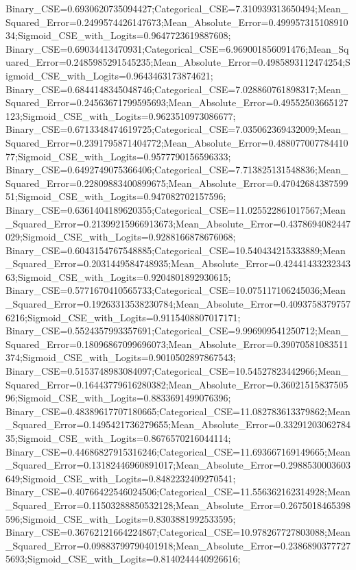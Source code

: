 Binary_CSE=0.6930620735094427;Categorical_CSE=7.310939313650494;Mean_Squared_Error=0.2499574426147673;Mean_Absolute_Error=0.49995731510891034;Sigmoid_CSE_with_Logits=0.9647723619887608;
Binary_CSE=0.69034413470931;Categorical_CSE=6.969001856091476;Mean_Squared_Error=0.2485985291545235;Mean_Absolute_Error=0.4985893112474254;Sigmoid_CSE_with_Logits=0.9643463173874621;
Binary_CSE=0.6844148345048746;Categorical_CSE=7.028860761898317;Mean_Squared_Error=0.24563671799595693;Mean_Absolute_Error=0.49552503665127123;Sigmoid_CSE_with_Logits=0.9623510973086677;
Binary_CSE=0.6713348474619725;Categorical_CSE=7.035062369432009;Mean_Squared_Error=0.2391795871404772;Mean_Absolute_Error=0.48807700778441077;Sigmoid_CSE_with_Logits=0.9577790156596333;
Binary_CSE=0.6492749075366406;Categorical_CSE=7.713825131548836;Mean_Squared_Error=0.22809883400899675;Mean_Absolute_Error=0.4704268438759951;Sigmoid_CSE_with_Logits=0.947082702157596;
Binary_CSE=0.6361404189620355;Categorical_CSE=11.025522861017567;Mean_Squared_Error=0.21399215966913673;Mean_Absolute_Error=0.4378694082447029;Sigmoid_CSE_with_Logits=0.9288166878676068;
Binary_CSE=0.6043154767548885;Categorical_CSE=10.540434215333889;Mean_Squared_Error=0.2031449584748935;Mean_Absolute_Error=0.4244143323234363;Sigmoid_CSE_with_Logits=0.9204801892930615;
Binary_CSE=0.5771670410565733;Categorical_CSE=10.075117106245036;Mean_Squared_Error=0.19263313538230784;Mean_Absolute_Error=0.40937583797576216;Sigmoid_CSE_with_Logits=0.9115408807017171;
Binary_CSE=0.5524357993357691;Categorical_CSE=9.996909541250712;Mean_Squared_Error=0.18096867099696073;Mean_Absolute_Error=0.39070581083511374;Sigmoid_CSE_with_Logits=0.9010502897867543;
Binary_CSE=0.5153748983084097;Categorical_CSE=10.54527823442966;Mean_Squared_Error=0.16443779616280382;Mean_Absolute_Error=0.3602151583750596;Sigmoid_CSE_with_Logits=0.8833691499076396;
Binary_CSE=0.48389617707180665;Categorical_CSE=11.082783613379862;Mean_Squared_Error=0.1495421736279655;Mean_Absolute_Error=0.3329120306278435;Sigmoid_CSE_with_Logits=0.8676570216044114;
Binary_CSE=0.44686827915316246;Categorical_CSE=11.693667169149665;Mean_Squared_Error=0.13182446960891017;Mean_Absolute_Error=0.2988530003603649;Sigmoid_CSE_with_Logits=0.8482232409270541;
Binary_CSE=0.40766422546024506;Categorical_CSE=11.556362162314928;Mean_Squared_Error=0.11503288850532128;Mean_Absolute_Error=0.2675018465398596;Sigmoid_CSE_with_Logits=0.8303881992533595;
Binary_CSE=0.36762121664224867;Categorical_CSE=10.978267727803088;Mean_Squared_Error=0.09883799790401918;Mean_Absolute_Error=0.23868903777275693;Sigmoid_CSE_with_Logits=0.8140244440926616;
